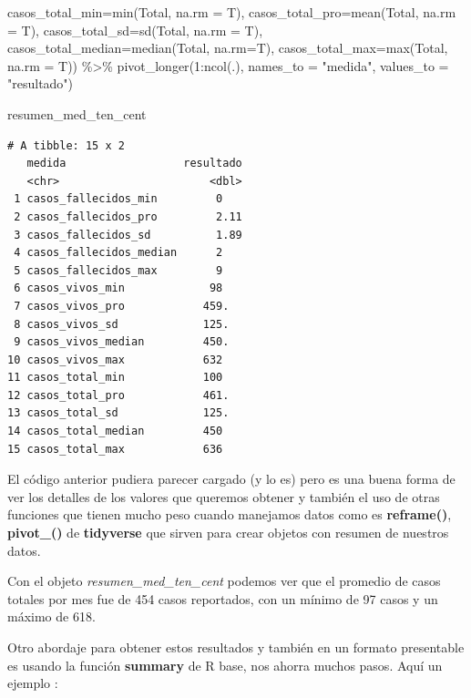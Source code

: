 \documentclass[
  letterpaper,
  DIV=11,
  numbers=noendperiod]{scrreprt}
\newenvironment{Shaded}{\begin{snugshade}}{\end{snugshade}}
\newcommand{\AttributeTok}[1]{\textcolor[rgb]{0.40,0.45,0.13}{#1}}
\newcommand{\DecValTok}[1]{\textcolor[rgb]{0.68,0.00,0.00}{#1}}
\newcommand{\FunctionTok}[1]{\textcolor[rgb]{0.28,0.35,0.67}{#1}}
\newcommand{\NormalTok}[1]{\textcolor[rgb]{0.00,0.23,0.31}{#1}}
\newcommand{\SpecialCharTok}[1]{\textcolor[rgb]{0.37,0.37,0.37}{#1}}
\newcommand{\StringTok}[1]{\textcolor[rgb]{0.13,0.47,0.30}{#1}}
\begin{document}
\begin{Shaded}
\begin{Highlighting}[]
          \AttributeTok{casos\_total\_min=}\FunctionTok{min}\NormalTok{(Total, }\AttributeTok{na.rm =}\NormalTok{ T),}
          \AttributeTok{casos\_total\_pro=}\FunctionTok{mean}\NormalTok{(Total, }\AttributeTok{na.rm =}\NormalTok{ T),}
          \AttributeTok{casos\_total\_sd=}\FunctionTok{sd}\NormalTok{(Total, }\AttributeTok{na.rm =}\NormalTok{ T),}
          \AttributeTok{casos\_total\_median=}\FunctionTok{median}\NormalTok{(Total, }\AttributeTok{na.rm=}\NormalTok{T),}
          \AttributeTok{casos\_total\_max=}\FunctionTok{max}\NormalTok{(Total, }\AttributeTok{na.rm =}\NormalTok{ T)) }\SpecialCharTok{\%\textgreater{}\%} 
  \FunctionTok{pivot\_longer}\NormalTok{(}\DecValTok{1}\SpecialCharTok{:}\FunctionTok{ncol}\NormalTok{(.), }\AttributeTok{names\_to =} \StringTok{"medida"}\NormalTok{, }\AttributeTok{values\_to =} \StringTok{"resultado"}\NormalTok{)}


  
\NormalTok{resumen\_med\_ten\_cent}
\end{Highlighting}
\end{Shaded}

\begin{verbatim}
# A tibble: 15 x 2
   medida                  resultado
   <chr>                       <dbl>
 1 casos_fallecidos_min         0   
 2 casos_fallecidos_pro         2.11
 3 casos_fallecidos_sd          1.89
 4 casos_fallecidos_median      2   
 5 casos_fallecidos_max         9   
 6 casos_vivos_min             98   
 7 casos_vivos_pro            459.  
 8 casos_vivos_sd             125.  
 9 casos_vivos_median         450.  
10 casos_vivos_max            632   
11 casos_total_min            100   
12 casos_total_pro            461.  
13 casos_total_sd             125.  
14 casos_total_median         450   
15 casos_total_max            636   
\end{verbatim}

El código anterior pudiera parecer cargado (y lo es) pero es una buena
forma de ver los detalles de los valores que queremos obtener y también
el uso de otras funciones que tienen mucho peso cuando manejamos datos
como es \textbf{reframe()}, \textbf{pivot\_()} de \textbf{tidyverse} que
sirven para crear objetos con resumen de nuestros datos.

Con el objeto \emph{resumen\_med\_ten\_cent} podemos ver que el promedio
de casos totales por mes fue de 454 casos reportados, con un mínimo de
97 casos y un máximo de 618.

Otro abordaje para obtener estos resultados y también en un formato
presentable es usando la función \textbf{summary} de R base, nos ahorra
muchos pasos. Aquí un ejemplo :
\end{document}

